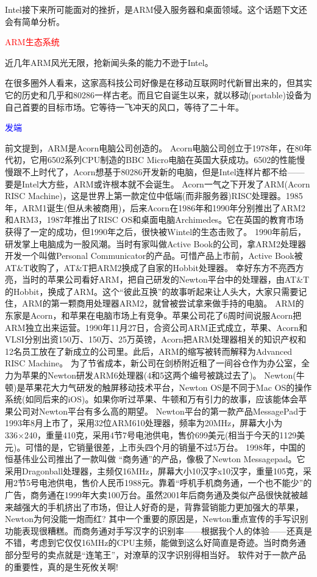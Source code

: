 \documentclass[utf8]{book}
\begin{document}
	Intel接下来所可能面对的挫折，是ARM侵入服务器和桌面领域。这个话题下文还会有简单分析。
	
	
	\begin{flushleft}
		{\Large \textcolor{red}{ARM生态系统}}
	\end{flushleft}

	近几年ARM风光无限，抢新闻头条的能力不逊于Intel。
	
	在很多圈外人看来，这家高科技公司好像是在移动互联网时代新冒出来的，但其实它的历史和几乎和80286一样古老。而且它自诞生以来，就以移动(portable)设备为自己首要的目标市场。它等待一飞冲天的风口，等待了二十年。
	
	\begin{flushleft}
		{\large \textcolor{blue}{发端}}
	\end{flushleft}
	
	前文提到，ARM是Acorn电脑公司创造的。
	Acorn电脑公司创立于1978年，在80年代初，它用6502系列CPU制造的BBC Micro电脑在英国大获成功。6502的性能慢慢跟不上时代了，Acorn想基于80286开发新的电脑，但是Intel连样片都不给——要是Intel大方些，ARM或许根本就不会诞生。
	Acorn一气之下开发了ARM(Acorn RISC Machine)，这是世界上第一款定位中低端(而非服务器)RISC处理器。1985年，ARM1诞生(但从未被商用)，后来Acorn在1986年和1990年分别推出了ARM2和ARM3，1987年推出了RISC OS和桌面电脑Archimedes。它在英国的教育市场获得了一定的成功，但1990年之后，很快被Wintel的生态击败了。
	1990年前后，研发掌上电脑成为一股风潮。当时有家叫做Active Book的公司，拿ARM2处理器开发一个叫做Personal Communicator的产品。可惜产品上市前，Active Book被AT\&T收购了，AT\&T把ARM2换成了自家的Hobbit处理器。
	幸好东方不亮西方亮，当时的苹果公司看好ARM，把自己研发的Newton平台中的处理器，由AT\&T的Hobbit，换成了ARM。这个“彼此互换”的故事听起来让人头大，大家只需要记住，ARM的第一颗商用处理器ARM2，就曾被尝试拿来做手持的电脑。
	ARM的东家是Acorn，和苹果在电脑市场上有竞争。苹果公司花了6周时间说服Acorn把ARM独立出来运营。1990年11月27日，合资公司ARM正式成立，苹果、Acorn和VLSI分别出资150万、150万、25万英镑，Acorn把ARM处理器相关的知识产权和12名员工放在了新成立的公司里。此后，ARM的缩写被转而解释为Advanced RISC Machine。
	为了节省成本，新公司在剑桥附近租了一间谷仓作为办公室，全力为苹果的Newton研发ARM6处理器(4和5这两个编号被跳过去了)。
	Newton(牛顿)是苹果花大力气研发的触屏移动技术平台，Newton OS是不同于Mac OS的操作系统(如同后来的iOS)。如果你听过苹果、牛顿和万有引力的故事，应该能体会苹果公司对Newton平台有多么高的期望。
	Newton平台的第一款产品MessagePad于1993年8月上市了，采用32位ARM610处理器，频率为20MHz，屏幕大小为336×240，重量410克，采用4节7号电池供电，售价699美元(相当于今天的1129美元)。可惜的是，它销量很差，上市头四个月的销量不过5万台。
	1998年，中国的恒基伟业公司推出了一款叫做 “商务通”的产品，像极了Newton Messagepad。它采用Dragonball处理器，主频仅16MHz，屏幕大小10汉字x10汉字，重量105克，采用2节5号电池供电，售价人民币1988元。靠着“呼机手机商务通，一个也不能少”的广告，商务通在1999年大卖100万台。虽然2001年后商务通及类似产品很快就被越来越强大的手机挤出了市场，但让人好奇的是，背靠营销能力更加强大的苹果，Newton为何没能一炮而红?
	其中一个重要的原因是，Newton重点宣传的手写识别功能表现很糟糕。而商务通对手写汉字的识别率——根据我个人的体验——还真是不错，考虑到它仅仅16MHz的CPU主频，能做到这么好简直是奇迹。当时商务通部分型号的卖点就是“连笔王”，对潦草的汉字识别得相当好。
	软件对于一款产品的重要性，真的是生死攸关啊!
	
\end{document}
